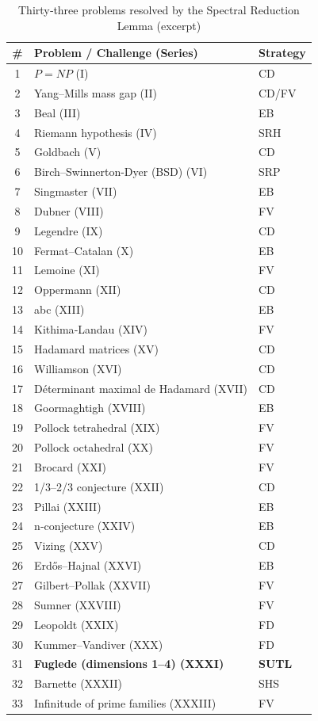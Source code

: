 \documentclass[11pt,a4paper]{article}
\begin{document}
\begin{center}
\small
\begin{longtable}{@{}cll@{}}
\caption{Thirty‑three problems resolved by the Spectral Reduction Lemma (excerpt)}\\
\toprule
\# & Problem / Challenge (Series) & Strategy \\
\midrule
1 & \(P = NP\) (I) & CD \\
2 & Yang–Mills mass gap (II) & CD/FV \\
3 & Beal (III) & EB \\
4 & Riemann hypothesis (IV) & SRH \\
5 & Goldbach (V) & CD \\
6 & Birch–Swinnerton-Dyer (BSD) (VI) & SRP \\
7 & Singmaster (VII) & EB \\
8 & Dubner (VIII) & FV \\
9 & Legendre (IX) & CD \\
10 & Fermat–Catalan (X) & EB \\
11 & Lemoine (XI) & FV \\
12 & Oppermann (XII) & CD \\
13 & abc (XIII) & EB \\
14 & Kithima‑Landau (XIV) & FV \\
15 & Hadamard matrices (XV) & CD \\
16 & Williamson (XVI) & CD \\
17 & Déterminant maximal de Hadamard (XVII) & CD \\
18 & Goormaghtigh (XVIII) & EB \\
19 & Pollock tetrahedral (XIX) & FV \\
20 & Pollock octahedral (XX) & FV \\
21 & Brocard (XXI) & FV \\
22 & 1/3–2/3 conjecture (XXII) & CD \\
23 & Pillai (XXIII) & EB \\
24 & n‑conjecture (XXIV) & EB \\
25 & Vizing (XXV) & CD \\
26 & Erdős–Hajnal (XXVI) & EB \\
27 & Gilbert–Pollak (XXVII) & FV \\
28 & Sumner (XXVIII) & FV \\
29 & Leopoldt (XXIX) & FD \\
30 & Kummer–Vandiver (XXX) & FD \\
31 & \textbf{Fuglede (dimensions 1–4) (XXXI)} & \textbf{SUTL} \\
32 & Barnette (XXXII) & SHS \\
33 & Infinitude of prime families (XXXIII) & FV \\
\bottomrule
\end{longtable}
\end{center}
\end{document}
